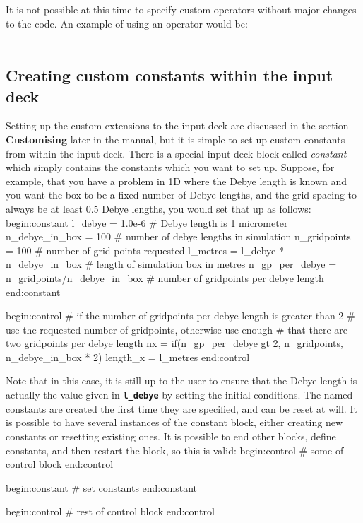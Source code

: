\documentclass[12pt,a4paper]{article}
\newcommand{\inlinecode}[1]{{\color{warwickred} \bf\texttt{#1}}}
\newcommand{\EPOCH}{{\color{warwickdark}\fontfamily{phv}\selectfont{EPOCH}}}
\newenvironment{boxverbatim}{\lboxverbatim{none}}{\endlboxverbatim}
\begin{document}
It is not possible at this time to specify custom operators without major
changes to the code. An example of using an operator would be:\\
\indent\inlinecode{length\_x = 10.0 + 12.0}\\

\subsection{Creating custom constants within the input deck}
Setting up the custom extensions to the input deck are discussed in the
section {\bf Customising {\EPOCH}} later in the manual, but it is simple to set
up custom constants from within the input deck. There is a special input deck
block called {\it constant} which simply contains the constants which you want
to set up. Suppose, for example, that you have a problem in 1D where the Debye
length is known and you want the box to be a fixed number of Debye lengths,
and the grid spacing to always be at least 0.5 Debye lengths, you would set
that up as follows:
\begin{boxverbatim}
begin:constant
  l_debye = 1.0e-6 # Debye length is 1 micrometer
  n_debye_in_box = 100 # number of debye lengths in simulation
  n_gridpoints = 100 # number of grid points requested
  l_metres = l_debye * n_debye_in_box # length of simulation box in metres
  n_gp_per_debye = n_gridpoints/n_debye_in_box # number of gridpoints per debye length
end:constant

begin:control
  # if the number of gridpoints per debye length is greater than 2
  # use the requested number of gridpoints, otherwise use enough
  # that there are two gridpoints per debye length
  nx = if(n_gp_per_debye gt 2, n_gridpoints, n_debye_in_box * 2)
  length_x = l_metres
end:control
\end{boxverbatim}

Note that in this case, it is still up to the user to ensure that the Debye
length is actually the value given in \inlinecode{l\_debye} by setting the
initial conditions. The named constants are created the first time they are
specified, and can be reset at will. It is possible to have several instances
of the constant block, either creating new constants or resetting existing
ones. It is possible to end other blocks, define constants, and then
restart the block, so this is valid:
\begin{boxverbatim}
begin:control
   # some of control block
end:control

begin:constant
   # set constants
end:constant

begin:control
   # rest of control block
end:control
\end{boxverbatim}
\end{document}
